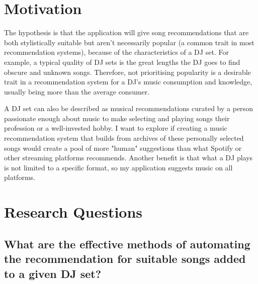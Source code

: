 \documentclass[]{article}
\begin{document}
\section{Motivation}
	The hypothesis is that the application will give song recommendations that are both stylistically suitable but aren't necessarily popular (a common trait in most recommendation systems), because of the characteristics of a DJ set. For example, a typical quality of DJ sets is the great lengths the DJ goes to find obscure and unknown songs. Therefore, not prioritising popularity is a desirable trait in a recommendation system for a DJ's music consumption and knowledge, usually being more than the average consumer. 
	
	A DJ set can also be described as musical recommendations curated by a person passionate enough about music to make selecting and playing songs their profession or a well-invested hobby. I want to explore if creating a music recommendation system that builds from archives of these personally selected songs would create a pool of more "human" suggestions than what Spotify or other streaming platforms recommends. Another benefit is that what a DJ plays is not limited to a specific format, so my application suggests music on all platforms.
	
\section{Research Questions}
	\subsection{What are the effective methods of automating the recommendation for suitable songs added to a given DJ set?}
\end{document}
